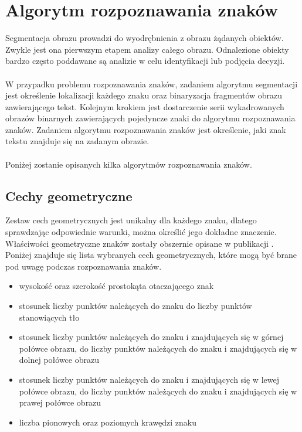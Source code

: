\section{Algorytm rozpoznawania znaków}
Segmentacja obrazu prowadzi do wyodrębnienia z obrazu żądanych obiektów. Zwykle jest ona pierwszym etapem analizy całego obrazu. Odnalezione obiekty bardzo często poddawane są analizie w celu identyfikacji lub podjęcia decyzji.
\paragraph{}
W przypadku problemu rozpoznawania znaków, zadaniem algorytmu segmentacji jest określenie lokalizacji każdego znaku oraz binaryzacja fragmentów obrazu zawierającego tekst. Kolejnym krokiem jest dostarczenie serii wykadrowanych obrazów binarnych zawierających pojedyncze znaki do algorytmu rozpoznawania znaków. Zadaniem algorytmu rozpoznawania znaków jest określenie, jaki znak tekstu znajduje się na zadanym obrazie.
\paragraph{}
Poniżej zostanie opisanych kilka algorytmów rozpoznawania znaków.
\subsection{Cechy geometryczne}
Zestaw cech geometrycznych jest unikalny dla każdego znaku, dlatego sprawdzając odpowiednie warunki, można określić jego dokładne znaczenie. Właściwości geometryczne znaków zostały obszernie opisane w publikacji \cite{frey91}. Poniżej znajduje się lista wybranych cech geometrycznych, które mogą być brane pod uwagę podczas rozpoznawania znaków.
\begin{itemize}
  \item wysokość oraz szerokość prostokąta otaczającego znak
  \item stosunek liczby punktów należących do znaku do liczby punktów stanowiących tło
  \item stosunek liczby punktów należących do znaku i znajdujących się w górnej połówce obrazu, do liczby punktów należących do znaku i znajdujących się w dolnej połówce obrazu
    \item stosunek liczby punktów należących do znaku i znajdujących się w lewej połówce  obrazu, do liczby punktów należących do znaku i znajdujących się w prawej połówce obrazu
    \item liczba pionowych oraz poziomych krawędzi znaku
\end{itemize}
